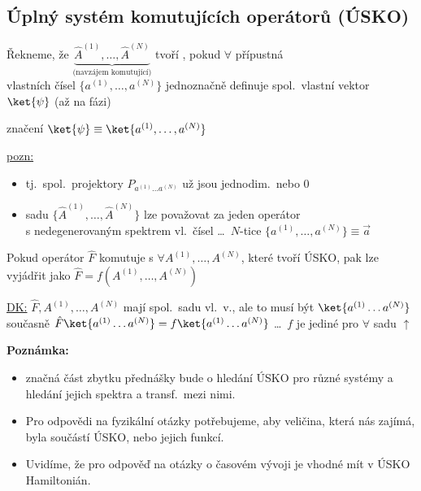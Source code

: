 \documentclass[11pt,a4paper]{article}
\begin{document}
\subsection*{Úplný systém komutujících operátorů (ÚSKO)}
\begin{definice}[ÚSKO]
Řekneme, že $\underbrace{\hat A^{(1)},\dots,\hat A^{(N)}}_{\text{(navzájem komutující)}}$ tvoří , pokud $\forall$ přípustná \\
vlastních čísel $\{a^{(1)},\dots,a^{(N)}\}$ jednoznačně definuje spol.\ vlastní vektor $\ket{\psi}$ (až na fázi)
\end{definice}

značení \quad $\ket{\psi} \equiv \ket{a^{(1)},\dots,a^{(N)}}$

\underline{pozn:}
\begin{itemize}[nosep]
  \item tj.\ spol.\ projektory $P_{a^{(1)}\dots a^{(N)}}$ už jsou jednodim.\ nebo $0$
  \item sadu $\{\hat A^{(1)},\dots,\hat A^{(N)}\}$ lze považovat za jeden operátor \\
        s nedegenerovaným spektrem vl.\ čísel \dots\ $N$-tice $\{a^{(1)},\dots,a^{(N)}\} \equiv \vec a$
\end{itemize}

\begin{veta}[Věta]
Pokud operátor $\hat F$ komutuje s $\forall A^{(1)},\dots,A^{(N)}$, které tvoří ÚSKO, pak lze vyjádřit jako $\hat F = f(A^{(1)},\dots,A^{(N)})$
\end{veta}

\underline{DK:} $\hat F, A^{(1)},\dots,A^{(N)}$ mají spol.\ sadu vl.\ v., ale to musí být $\ket{a^{(1)}\dots a^{(N)}}$ \\
\quad současně $\hat F\ket{a^{(1)}\dots a^{(N)}} = f\ket{a^{(1)}\dots a^{(N)}}$ \dots\ $f$ je jediné pro $\forall$ sadu $\uparrow$

\textbf{Poznámka:}
\begin{itemize}[nosep]
  \item značná část zbytku přednášky bude o hledání ÚSKO pro různé systémy a hledání jejich spektra a transf.\ mezi nimi.
  \item Pro odpovědi na fyzikální otázky potřebujeme, aby veličina, která nás zajímá, byla součástí ÚSKO, nebo jejich funkcí.
  \item Uvidíme, že pro odpověď na otázky o časovém vývoji je vhodné mít v ÚSKO Hamiltonián.
\end{itemize}
\end{document}
